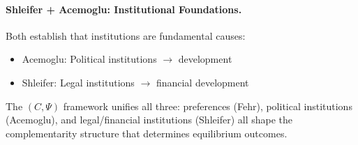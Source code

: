 \paragraph{Shleifer + Acemoglu: Institutional Foundations.}
Both establish that institutions are fundamental causes:
\begin{itemize}
  \item Acemoglu: Political institutions $\to$ development
  \item Shleifer: Legal institutions $\to$ financial development
\end{itemize}

The $(C, \Psi)$ framework unifies all three: preferences (Fehr), political
institutions (Acemoglu), and legal/financial institutions (Shleifer) all
shape the complementarity structure that determines equilibrium outcomes.

